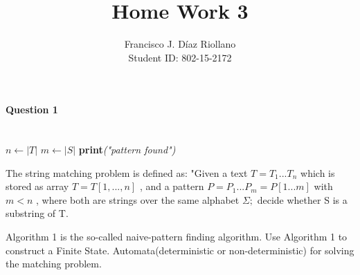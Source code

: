 \documentclass{report}
\title{Home Work 3}
\author{Francisco J. Díaz Riollano \\ Student ID: 802-15-2172 }
\newcommand{\me}[1]{
\begin{math}
#1
\end{math}
}
\begin{document}
\maketitle
\paragraph{\Large{Question 1\\ \\}}


\begin{algorithm}
  \begin{algorithmic}[1]
      \State $n\gets |T|$
      \State $m\gets |S|$
      	\State \textbf{print}\textit{("pattern found")}
      \EndIf
      \EndFor     
    \EndProcedure
  \end{algorithmic}
\end{algorithm}


The string matching problem is defined as: "Given a text \me{T=T_1 ... T_n} which is stored as array \me{T= T[1,...,n]} , and a pattern \me{P = P_1 ... P_m = P[1...m]} with \me{m<n}, where both are strings over the same alphabet \me{\Sigma;}decide whether S is a substring of T.

Algorithm 1 is the so-called naive-pattern finding algorithm. Use Algorithm 1 to construct a Finite State. Automata(deterministic or non-deterministic) for solving the matching problem.
\newline

 
\end{document}
